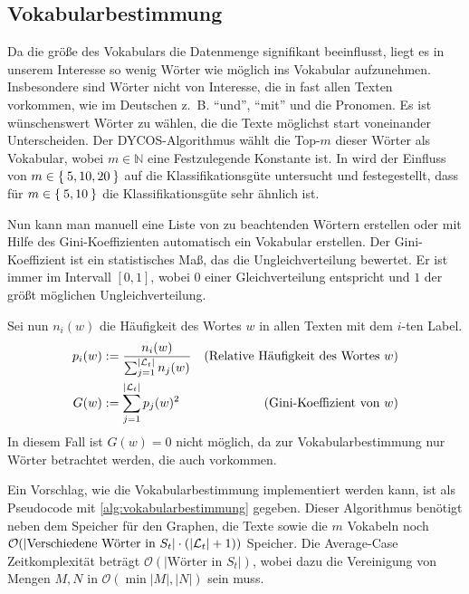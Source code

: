 \subsection{Vokabularbestimmung}\label{sec:vokabularbestimmung}
Da die größe des Vokabulars die Datenmenge signifikant beeinflusst,
liegt es in unserem Interesse so wenig Wörter wie möglich ins
Vokabular aufzunehmen. Insbesondere sind Wörter nicht von Interesse,
die in fast allen Texten vorkommen, wie im Deutschen z.~B.
\enquote{und}, \enquote{mit} und die Pronomen. Es ist wünschenswert
Wörter zu wählen, die die Texte möglichst start voneinander Unterscheiden.
Der DYCOS-Algorithmus wählt die Top-$m$ dieser Wörter als Vokabular,
wobei $m \in \mathbb{N}$ eine Festzulegende Konstante ist. In \cite[S. 365]{aggarwal2011}
wird der Einfluss von $m \in \Set{5,10, 20}$ auf die Klassifikationsgüte
untersucht und festegestellt, dass für $m \in \Set{5,10}$ die Klassifikationsgüte 
sehr ähnlich ist.

Nun kann man manuell eine Liste von zu beachtenden Wörtern erstellen
oder mit Hilfe des Gini-Koeffizienten automatisch ein Vokabular erstellen.
Der Gini-Koeffizient ist ein statistisches Maß, das die Ungleichverteilung
bewertet. Er ist immer im Intervall $[0,1]$, wobei $0$ einer 
Gleichverteilung entspricht und $1$ der größt möglichen Ungleichverteilung.

Sei nun $n_i(w)$ die Häufigkeit des Wortes $w$ in allen Texten mit 
dem $i$-ten Label.
\begin{align}
    p_i(w) &:= \frac{n_i(w)}{\sum_{j=1}^{|\mathcal{L}_t|} n_j(w)} &\text{(Relative Häufigkeit des Wortes $w$)}\\
    G(w)   &:= \sum_{j=1}^{|\mathcal{L}_t|} p_j(w)^2              &\text{(Gini-Koeffizient von $w$)}
\end{align}
In diesem Fall ist $G(w)=0$ nicht möglich, da zur Vokabularbestimmung
nur Wörter betrachtet werden, die auch vorkommen.

Ein Vorschlag, wie die Vokabularbestimmung implementiert werden kann,
ist als Pseudocode mit \cref{alg:vokabularbestimmung}
gegeben. Dieser Algorithmus benötigt neben dem Speicher für den
Graphen, die Texte sowie die $m$ Vokabeln noch $\mathcal{O}(|\text{Verschiedene Wörter in } S_t| \cdot (|\mathcal{L}_t| + 1))$
Speicher. Die Average-Case Zeitkomplexität beträgt 
$\mathcal{O}(|\text{Wörter in } S_t|)$, wobei dazu die Vereinigung
von Mengen $M,N$ in $\mathcal{O}(\min{|M|, |N|})$ sein muss.

